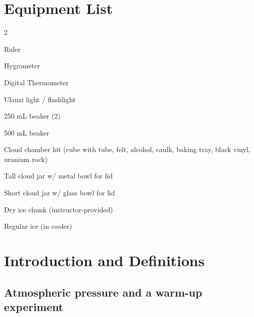 

\section*{Equipment List}

\begin{multicols}{2}   %
\begin{equipment}
\item Ruler
\item Hygrometer
\item Digital Thermometer
\item Ulanzi light / flashlight
\item 250 mL beaker (2)
\item 500 mL beaker 
\item Cloud chamber kit (cube with tube, felt, alcohol, caulk, baking tray, black vinyl, uranium rock)
\item Tall cloud jar w/ metal bowl for lid
\item Short cloud jar w/ glass bowl for lid
\item Dry ice chunk (instructor-provided)
\item Regular ice (in cooler)
\end{equipment}
\end{multicols}


\section{Introduction and Definitions}

\subsection{Atmospheric pressure and a warm-up experiment}

